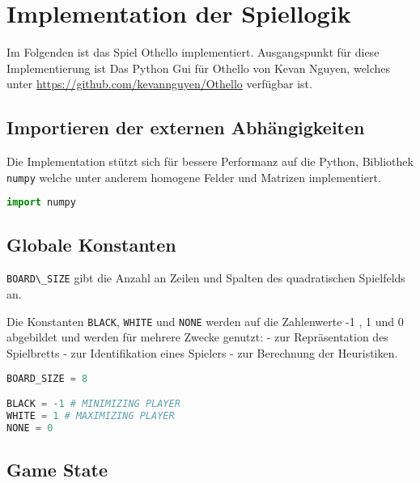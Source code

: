 \hypertarget{implementation-der-spiellogik}{%
\section{Implementation der
Spiellogik}\label{implementation-der-spiellogik}}

Im Folgenden ist das Spiel Othello implementiert. Ausgangspunkt für
diese Implementierung ist Das Python Gui für Othello von Kevan Nguyen,
welches unter \url{https://github.com/kevannguyen/Othello} verfügbar
ist.

\hypertarget{importieren-der-externen-abhuxe4ngigkeiten}{%
\subsection{Importieren der externen
Abhängigkeiten}\label{importieren-der-externen-abhuxe4ngigkeiten}}

Die Implementation stützt sich für bessere Performanz auf die Python,
Bibliothek \passthrough{\lstinline!numpy!} welche unter anderem homogene
Felder und Matrizen implementiert.

\begin{lstlisting}[language=Python]
import numpy
\end{lstlisting}

\hypertarget{globale-konstanten}{%
\subsection{Globale Konstanten}\label{globale-konstanten}}

\passthrough{\lstinline!BOARD\_SIZE!} gibt die Anzahl an Zeilen und
Spalten des quadratischen Spielfelds an.

Die Konstanten \passthrough{\lstinline!BLACK!},
\passthrough{\lstinline!WHITE!} und \passthrough{\lstinline!NONE!}
werden auf die Zahlenwerte -1 , 1 und 0 abgebildet und werden für
mehrere Zwecke genutzt: - zur Repräsentation des Spielbretts - zur
Identifikation eines Spielers - zur Berechnung der Heuristiken.

\begin{lstlisting}[language=Python]
BOARD_SIZE = 8

BLACK = -1 # MINIMIZING PLAYER
WHITE = 1 # MAXIMIZING PLAYER
NONE = 0
\end{lstlisting}

\hypertarget{game-state}{%
\subsection{Game State}\label{game-state}}

